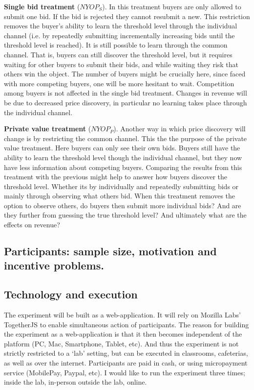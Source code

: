 \documentclass[a4paper,12pt]{article}
\begin{document}
	{\bf Single bid treatment} ($NYOP_S$).
	In this treatment buyers are only allowed to submit one bid. If the bid is rejected they cannot resubmit a new. This restriction removes the buyer's ability to learn the threshold level through the individual channel (i.e. by repeatedly submitting incrementally increasing bids until the threshold level is reached). It is still possible to learn through the common channel. That is, buyers can still discover the threshold level, but it requires waiting for other buyers to submit their bids, and while waiting they risk that others win the object. The number of buyers might be crucially here, since faced with more competing buyers, one will be more hesitant to wait. Competition among buyers is not affected in the single bid treatment. Changes in revenue will be due to decreased price discovery, in particular no learning takes place through the individual channel.

	{\bf Private value treatment} ($NYOP_P$).
	Another way in which price discovery will change is by restricting the common channel. This the the purpose of the private value treatment. Here buyers can only see their own bids. Buyers still have the ability to learn the threshold level though the individual channel, but they now have less information about competing buyers. Comparing the results from this treatment with the previous might help to answer how buyers discover the threshold level. Whether its by individually and repeatedly submitting bids or mainly through observing what others bid. When this treatment removes the option to observe others, do buyers then submit more individual bids? And are they further from guessing the true threshold level? And ultimately what are the effects on revenue? 

	\subsection{Participants: sample size, motivation and incentive problems.}


	\subsection{Technology and execution}
	The experiment will be built as a web-application. It will rely on Mozilla Labs' TogetherJS to enable simultaneous action of participants. The reason for building the experiment as a web-application is that it then becomes independent of the platform (PC, Mac, Smartphone, Tablet, etc). And thus the experiment is not strictly restricted to a `lab' setting, but can be executed in classrooms, cafeterias, as well as over the internet. Participants are paid in cash, or using micropayment service (MobilePay, Paypal, etc). I would like to run the experiment three times; inside the lab, in-person outside the lab, online.
\end{document}
